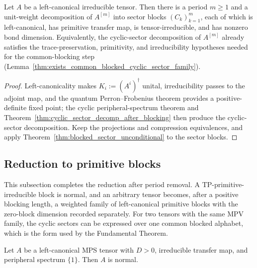 \begin{theorem}%
    \label{thm:cyclic_sector_decomp_irr_tp_prim_irr}
    \leanok
    Let $A$ be a left-canonical irreducible tensor. Then there is a period
    $m \ge 1$ and a unit-weight decomposition of $A^{[m]}$ into sector blocks
    $(C_k)_{k=1}^m$, each of which is left-canonical, has primitive transfer map,
    is tensor-irreducible, and has nonzero bond dimension. Equivalently, the
    cyclic-sector decomposition of $A^{[m]}$ already satisfies the
    trace-preservation, primitivity, and irreducibility hypotheses needed for the
    common-blocking step
    (Lemma~\ref{thm:exists_common_blocked_cyclic_sector_family}).
\end{theorem}

\begin{proof}\leanok
    Left-canonicality makes $K_i := (A^i)^\dagger$ unital, irreducibility passes
    to the adjoint map, and the quantum Perron--Frobenius theorem provides a
    positive-definite fixed point; the cyclic peripheral-spectrum theorem and
    Theorem~\ref{thm:cyclic_sector_decomp_after_blocking} then produce the
    cyclic-sector decomposition. Keep the projections and compression
    equivalences, and apply
    Theorem~\ref{thm:blocked_sector_unconditional} to the sector blocks.
\end{proof}

\subsection{Reduction to primitive blocks}%
\label{sec:reduction_to_normal_form}

This subsection completes the reduction after period removal. A
TP-primitive-irreducible block is normal, and an arbitrary tensor becomes, after a
positive blocking length, a weighted family of left-canonical primitive blocks
with the zero-block dimension recorded separately. For two tensors with the same
MPV family, the cyclic sectors can be expressed over one common blocked alphabet,
which is the form used by the Fundamental Theorem.

\begin{theorem}%
    \label{thm:normal_tp_primitive_irred}
    \leanok
    Let $A$ be a left-canonical MPS tensor with $D > 0$, irreducible transfer
    map, and peripheral spectrum $\{1\}$. Then $A$ is normal.
\end{theorem}

